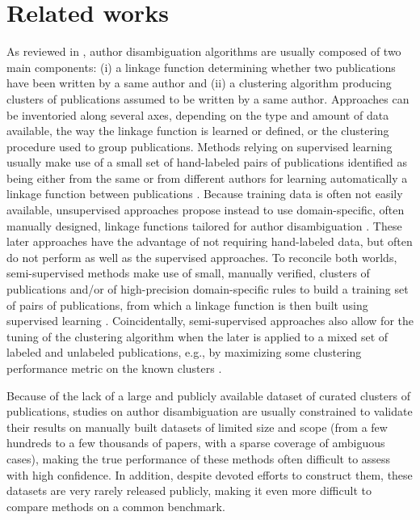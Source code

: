 \documentclass{article}
\begin{document}

\section{Related works}
\label{related-works}

As reviewed in
\citep{smalheiser2009author,ferreira2012brief,levin2012citation}, author
disambiguation algorithms are usually composed of two main components: (i) a
linkage function determining whether two publications have been written by a
same author and (ii) a clustering algorithm producing clusters of publications
assumed to be written by a same author. Approaches can be inventoried along
several axes, depending on the type and amount of data available, the way the
linkage function is learned or defined, or the clustering procedure used to
group publications. Methods relying on supervised learning usually make use of
a small set of
hand-labeled pairs of publications identified as being either from the same or
from different authors for learning automatically a linkage function between
publications \citep{han2004two,huang2006efficient,
culotta2007author,treeratpituk2009disambiguating,tran2014author}. Because
training data is often not easily available, unsupervised approaches propose
instead to use domain-specific, often manually designed, linkage functions tailored for author
disambiguation \citep{malin2005unsupervised,mcrae2006also,song2007efficient,
soler2007separating, kang2009co,fan2011graph,schulz2014exploiting}. These later
approaches have the advantage of not requiring  hand-labeled data, but often do
not perform as well as the supervised approaches. To reconcile both worlds,
semi-supervised methods make use of small, manually verified, clusters of
publications and/or of high-precision domain-specific rules to build a training
set of pairs of publications, from which a linkage function is then built
using supervised learning
\citep{ferreira2010effective,torvik2009author,levin2012citation}.
Coincidentally, semi-supervised approaches also allow for the tuning of the
clustering algorithm when the later is applied to a mixed set of labeled
and unlabeled publications, e.g., by maximizing some clustering performance
metric on the known clusters \citep{levin2012citation}.

Because of the lack of a large and publicly available dataset of curated
clusters of publications, studies on author disambiguation are usually
constrained to validate their results on manually built datasets of limited
size and scope (from a few hundreds to a few thousands of papers, with a sparse
coverage of ambiguous cases), making the true performance of these methods
often difficult to assess with high confidence. In addition, despite devoted
efforts to construct them, these datasets are very rarely released publicly,
making it even more difficult to compare methods on a common benchmark.
\end{document}
